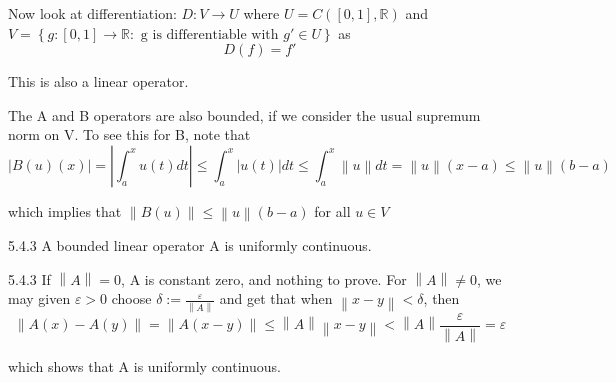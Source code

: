\documentclass[a4paper,norsk]{article}
\renewcommand{\leq}{\leqslant}
\renewcommand{\epsilon}{\varepsilon}
\begin{document}
Now look at differentiation: $ D : V \to U $ where $ U = C \left( \left[ 0, 1 \right] , \mathbb{R} \right)  $ and $ V = \left\{ g : \left[ 0, 1 \right] \to \mathbb{R} : \text{ g is differentiable with } g' \in U \right\}  $ as 
\[
    D (f) = f'
\]

This is also a linear operator.





The A and B operators are also bounded, if we consider the usual supremum norm on V. To see this for B, note that
\[
    \left| B(u)(x) \right| = \left| \int_{a}^{x} u(t)dt  \right| \leq \int_{a}^{x} \left| u(t) \right| dt \leq \int_{a}^{x} \left\lVert u \right\rVert dt = \left\lVert u \right\rVert \left( x-a \right) \leq \left\lVert u \right\rVert \left( b-a \right)    
\]

which implies that $ \left\lVert B(u) \right\rVert \leq  \left\lVert u \right\rVert \left( b-a \right)  $ for all $ u \in  V $ 


\begin{lemmabox}{5.4.3}{}
A bounded linear operator A is uniformly continuous.

\begin{proofbox}{5.4.3}{}
  If $ \left\lVert A \right\rVert = 0 $, A is constant zero, and nothing to prove. For $ \left\lVert A \right\rVert \neq 0 $, we may given $ \epsilon > 0 $ choose $ \delta  := \frac{ \epsilon    }{ \left\lVert A \right\rVert  } $ and get that when $ \left\lVert x-y \right\rVert < \delta  $, then 
  \[
      \left\lVert A(x) - A(y) \right\rVert = \left\lVert A \left( x-y \right)  \right\rVert \leq \left\lVert A \right\rVert \left\lVert x-y \right\rVert < \left\lVert A \right\rVert \frac{ \epsilon    }{ \left\lVert A \right\rVert  } = \epsilon 
  \]

  which shows that A is uniformly continuous.
\end{proofbox}
\end{lemmabox}
\end{document}

